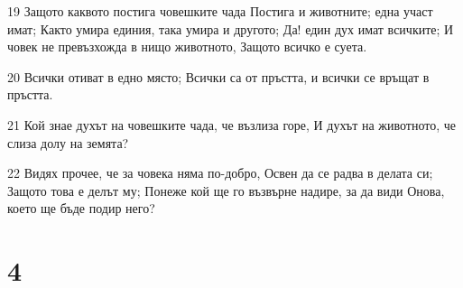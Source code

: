 \par 19 Защото каквото постига човешките чада Постига и животните; една участ имат; Както умира единия, така умира и другото; Да! един дух имат всичките; И човек не превъзхожда в нищо животното, Защото всичко е суета.
\par 20 Всички отиват в едно място; Всички са от пръстта, и всички се връщат в пръстта.
\par 21 Кой знае духът на човешките чада, че възлиза горе, И духът на животното, че слиза долу на земята?
\par 22 Видях прочее, че за човека няма по-добро, Освен да се радва в делата си; Защото това е делът му; Понеже кой ще го възвърне надире, за да види Онова, което ще бъде подир него?

\chapter{4}

